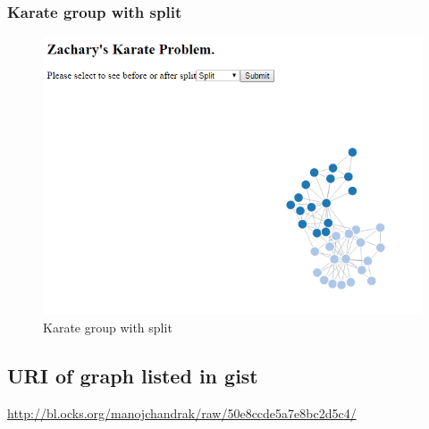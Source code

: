 \documentclass[12pt]{article}
\begin{document}
\subsubsection{Karate group with split}
\begin{figure}[ht]
\includegraphics[scale=0.4]{../q3/gr4.png}
\centering
\caption{Karate group with split}
\label{}
\end{figure}
\subsection{URI of graph listed in gist}
\url{http://bl.ocks.org/manojchandrak/raw/50e8ccde5a7e8bc2d5c4/}
\newpage









\cite{*}
\end{document}
